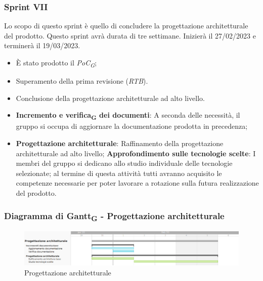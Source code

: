 \subsubsection{Sprint VII}
Lo scopo di questo sprint è quello di concludere la progettazione architetturale del prodotto.
Questo sprint avrà durata di tre settimane. Inizierà il 27/02/2023 e terminerà il 19/03/2023.

\:
\begin{itemize}
    \item È stato prodotto il \textit{PoC\textsubscript{G}};
    \item Superamento della prima revisione (\textit{RTB}).
\end{itemize}

\:
\begin{itemize}
    \item Conclusione della progettazione architetturale ad alto livello.
\end{itemize}

\:
\begin{itemize}
    \item \textbf{Incremento e verifica\textsubscript{G} dei documenti}: A seconda delle necessità, il gruppo si occupa di aggiornare la documentazione prodotta in precedenza;
    \item \textbf{Progettazione architetturale}: Raffinamento della progettazione architetturale ad alto livello;
        \subitem \textbf{Approfondimento sulle tecnologie scelte}: I membri del gruppo si dedicano allo studio individuale delle tecnologie selezionate; al termine di questa attività tutti avranno acquisito le competenze necessarie per poter lavorare a rotazione sulla futura realizzazione del prodotto.
\end{itemize}

\subsubsection{Diagramma di Gantt\textsubscript{G} - Progettazione architetturale}

\begin{figure}[H]
\centering
\includegraphics[width=\textwidth]{img/4_progettazione.png}
\caption{Progettazione architetturale}
\end{figure}


